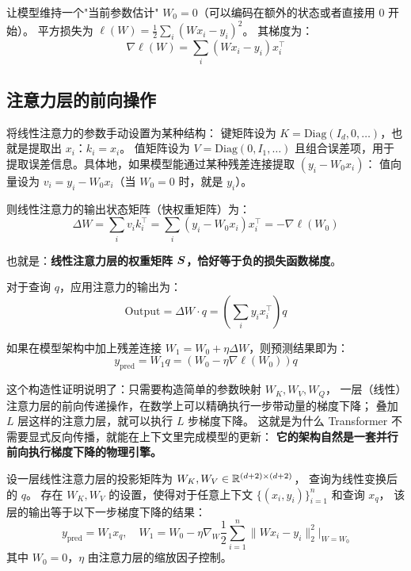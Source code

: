 让模型维持一个"当前参数估计" $W_0 = 0$（可以编码在额外的状态或者直接用 $0$ 开始）。
平方损失为 $\ell(W) = \frac{1}{2} \sum_{i} (W x_i - y_i)^2$。
其梯度为：
\[
  \nabla \ell(W) = \sum_i (W x_i - y_i) x_i^\top
\]

\subsection*{注意力层的前向操作}

将线性注意力的参数手动设置为某种结构：
键矩阵设为 $K = \text{Diag}(I_{d}, 0, \ldots)$，也就是提取出 $x_i$：$k_i = x_i$。
值矩阵设为 $V = \text{Diag}(0, I_{1}, \ldots)$ 且组合误差项，用于提取误差信息。具体地，如果模型能通过某种残差连接提取 $(y_i - W_0 x_i)$：
值向量设为 $v_i = y_i - W_0 x_i$（当 $W_0=0$ 时，就是 $y_i$）。

则线性注意力的输出状态矩阵（快权重矩阵）为：
\begin{equation}
  \Delta W = \sum_i v_i k_i^\top = \sum_i (y_i - W_0 x_i) x_i^\top = -\nabla \ell(W_0)
  \label{eq:icl_gd_update}
\end{equation}

也就是：\textbf{线性注意力层的权重矩阵 $\boldsymbol{S}$，恰好等于负的损失函数梯度}。

对于查询 $q$，应用注意力的输出为：
\begin{equation}
  \text{Output} = \Delta W \cdot q = \left( \sum_i y_i x_i^\top \right) q
\end{equation}

如果在模型架构中加上残差连接 $W_1 = W_0 + \eta \Delta W$，则预测结果即为：
\begin{equation}
  y_{\text{pred}} = W_1 q = (W_0 - \eta \nabla \ell(W_0)) q
\end{equation}

\begin{insight}[title=Transformer的前向计算是在线优化]
这个构造性证明说明了：只需要构造简单的参数映射 $W_K, W_V, W_Q$，
一层（线性）注意力层的前向传递操作，在数学上可以精确执行一步带动量的梯度下降；
叠加 $L$ 层这样的注意力层，就可以执行 $L$ 步梯度下降。
这就是为什么 Transformer 不需要显式反向传播，就能在上下文里完成模型的更新：
\textbf{它的架构自然是一套并行前向执行梯度下降的物理引擎。}
\end{insight}

\begin{theorem}
\label{thm:icl_gd}
设一层线性注意力层的投影矩阵为
$W_K, W_V \in \mathbb{R}^{(d+2) \times (d+2)}$，
查询为线性变换后的 $q$。
存在 $W_K, W_V$ 的设置，使得对于任意上下文
$\{(x_i, y_i)\}_{i=1}^{n}$ 和查询 $x_q$，
该层的输出等于以下一步梯度下降的结果：
\begin{equation}
  y_{\text{pred}} = W_1 x_q, \quad
  W_1 = W_0 - \eta \nabla_{W} \frac{1}{2}\sum_{i=1}^{n} \|W x_i - y_i\|_2^2 \Big|_{W=W_0}
  \label{eq:icl_theorem}
\end{equation}
其中 $W_0 = 0$，$\eta$ 由注意力层的缩放因子控制。
\end{theorem}

